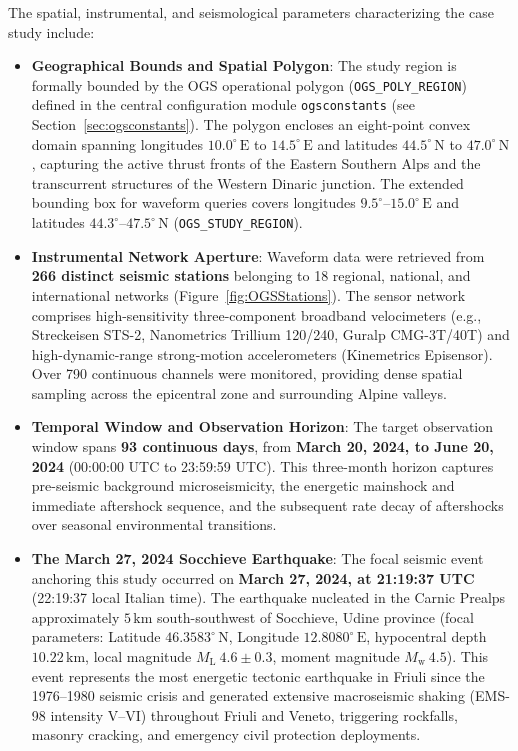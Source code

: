 The spatial, instrumental, and seismological parameters characterizing the case study include:
\begin{itemize}
  \item \textbf{Geographical Bounds and Spatial Polygon}: The study region is formally bounded by the OGS operational polygon (\texttt{OGS\_POLY\_REGION}) defined in the central configuration module \texttt{ogsconstants} (see Section~\ref{sec:ogsconstants}). The polygon encloses an eight-point convex domain spanning longitudes $10.0^\circ\,\mathrm{E}$ to $14.5^\circ\,\mathrm{E}$ and latitudes $44.5^\circ\,\mathrm{N}$ to $47.0^\circ\,\mathrm{N}$, capturing the active thrust fronts of the Eastern Southern Alps and the transcurrent structures of the Western Dinaric junction. The extended bounding box for waveform queries covers longitudes $9.5^\circ\text{--}15.0^\circ\,\mathrm{E}$ and latitudes $44.3^\circ\text{--}47.5^\circ\,\mathrm{N}$ (\texttt{OGS\_STUDY\_REGION}).
  \item \textbf{Instrumental Network Aperture}: Waveform data were retrieved from \textbf{266 distinct seismic stations} belonging to 18 regional, national, and international networks (Figure~\ref{fig:OGSStations}). The sensor network comprises high-sensitivity three-component broadband velocimeters (e.g., Streckeisen STS-2, Nanometrics Trillium 120/240, Guralp CMG-3T/40T) and high-dynamic-range strong-motion accelerometers (Kinemetrics Episensor). Over 790 continuous channels were monitored, providing dense spatial sampling across the epicentral zone and surrounding Alpine valleys.
  \item \textbf{Temporal Window and Observation Horizon}: The target observation window spans \textbf{93 continuous days}, from \textbf{March 20, 2024, to June 20, 2024} (00:00:00 UTC to 23:59:59 UTC). This three-month horizon captures pre-seismic background microseismicity, the energetic mainshock and immediate aftershock sequence, and the subsequent rate decay of aftershocks over seasonal environmental transitions.
  \item \textbf{The March 27, 2024 Socchieve Earthquake}: The focal seismic event anchoring this study occurred on \textbf{March 27, 2024, at 21:19:37 UTC} (22:19:37 local Italian time). The earthquake nucleated in the Carnic Prealps approximately $5\,\mathrm{km}$ south-southwest of Socchieve, Udine province (focal parameters: Latitude $46.3583^\circ\,\mathrm{N}$, Longitude $12.8080^\circ\,\mathrm{E}$, hypocentral depth $10.22\,\mathrm{km}$, local magnitude $M_{\mathrm{L}}~4.6 \pm 0.3$, moment magnitude $M_{\mathrm{w}}~4.5$). This event represents the most energetic tectonic earthquake in Friuli since the 1976--1980 seismic crisis and generated extensive macroseismic shaking (EMS-98 intensity V--VI) throughout Friuli and Veneto, triggering rockfalls, masonry cracking, and emergency civil protection deployments.

\end{itemize}
